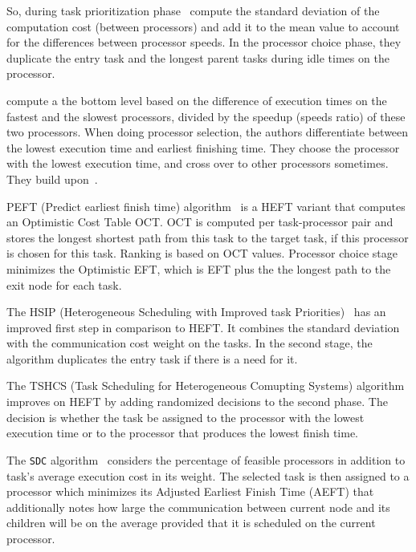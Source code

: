 \documentclass[conference]{IEEEtran}
\begin{document}
    So, during task prioritization phase~\cite{sulaiman2021hybrid} compute the standard deviation of the computation cost
    (between processors) and add it to the mean value to account for the differences between processor speeds.
    In the processor choice phase, they duplicate the entry task and the longest parent tasks during idle times on the processor.

    \cite{alebrahim2017task} compute a the bottom level based on the difference of execution times on
    the fastest and the slowest processors, divided by the speedup (speeds ratio) of these two processors.
    When doing processor selection, the authors differentiate between the lowest execution time and earliest finishing time.
    They choose the processor with the lowest execution time, and cross over to other processors sometimes.
    They build upon~\cite{shetti2013optimization}.

    PEFT (Predict earliest finish time) algorithm~\cite{arabnejad2014list} is a HEFT variant that computes an Optimistic
    Cost Table OCT.
    OCT is computed per task-processor pair and stores the longest shortest path from this task to the target task, if this
    processor is chosen for this task.
    Ranking is based on OCT values.
    Processor choice stage minimizes the Optimistic EFT, which is EFT plus the the longest path to the exit node for each task.

    The HSIP (Heterogeneous Scheduling with Improved task Priorities)~\cite{wang2016hsip} has an improved first step in
    comparison to HEFT.
    It combines the standard deviation with the communication cost weight on the tasks.
    In the second stage, the algorithm duplicates the entry task if there is a need for it.

    The TSHCS (Task Scheduling for Heterogeneous Comupting Systems) algorithm~\cite{alebrahim2017task} improves on HEFT
    by adding randomized decisions to the second phase.
    The decision is whether the task be assigned to the processor with the lowest execution time or to the processor that
    produces the lowest finish time.

    The \texttt{SDC} algorithm~\cite{SHI2006665} considers the percentage of feasible processors in addition to task’s
    average execution cost in its weight.
    The selected task is then assigned to a processor which minimizes its Adjusted Earliest Finish Time (AEFT) that
    additionally notes how large the communication between current node and its children will be on the
    average provided that it is scheduled on the current processor.
\end{document}
